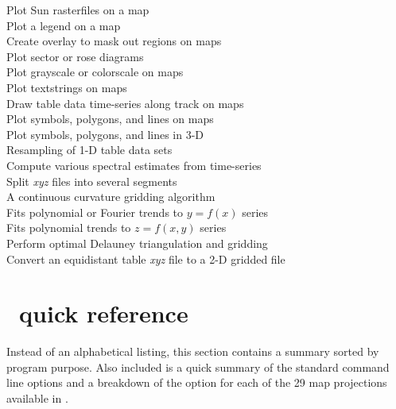 \begin{tabbing}
	\>	Plot Sun rasterfiles on a map \\ 
	\>	Plot a legend on a map \\ 
	\>	Create overlay to mask out regions on maps \\ 
	\>	Plot sector or rose diagrams \\ 
	\>	Plot grayscale or colorscale on maps \\ 
	\>	Plot textstrings on maps \\ 
	\>	Draw table data time-series along track on maps \\ 
		\>	Plot symbols, polygons, and lines on maps \\ 
		\>	Plot symbols, polygons, and lines in 3-D \\ 
	\>	Resampling of 1-D table data sets \\ 
	\>	Compute various spectral estimates from time-series \\ 
	\>	Split {\it xyz} files into several segments \\ 
	\>	A continuous curvature gridding algorithm \\ 
	\>	Fits polynomial or Fourier trends to $y = f(x)$ series \\ 
	\>	Fits polynomial trends to $z = f(x,y)$ series \\ 
	\>	Perform optimal Delauney triangulation and gridding \\ 
	\>	Convert an equidistant table {\it xyz} file to a 2-D gridded file
\end{tabbing}

\section{\gmt\ quick reference}
\label{sec:purpose}
Instead of an alphabetical listing, this section contains a summary
sorted by program purpose.  Also included is a quick summary of the
standard command line options and a breakdown of the  option
for each of the 29 map projections available in \GMT. \\


